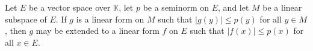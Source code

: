 Let $E$ be a vector space over $\mathbb{K}$, let $p$ be a seminorm on $E$, and let $M$ be a linear subspace of $E$. If $g$ is a linear form on $M$ such that $|g(y)| \leq p(y)$ for all $y \in M$, then $g$ may be extended to a linear form $f$ on $E$ such that $|f(x)| \leq p(x)$ for all $x \in E$.